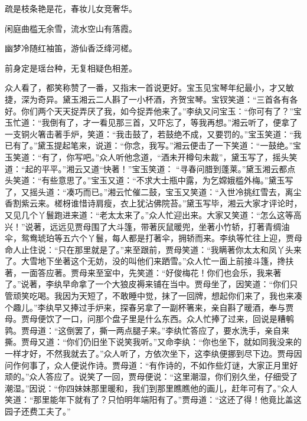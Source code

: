 \begin{poem}
\begin{pl}
        疏是枝条艳是花，春妆儿女竞奢华。
    \end{pl}
    \begin{pl}

        闲庭曲槛无余雪，流水空山有落霞。
    \end{pl}
    \begin{pl}

        幽梦冷随红袖笛，游仙香泛绛河槎。
    \end{pl}
    \begin{pl}

        前身定是瑶台种，无复相疑色相差。
    \end{pl}
\end{poem}


\begin{parag}
    众人看了，都笑称赞了一番，又指末一首说更好。宝玉见宝琴年纪最小，才又敏捷，深为奇异。黛玉湘云二人斟了一小杯酒，齐贺宝琴。宝钗笑道：“三首各有各好。你们两个天天捉弄厌了我，如今捉弄他来了。”李纨又问宝玉：“你可有了？”宝玉忙道：“我倒有了，才一看见那三首，又吓忘了，等我再想。”湘云听了，便拿了一支铜火箸击著手炉，笑道：“我击鼓了，若鼓绝不成，又要罚的。”宝玉笑道：“我已有了。”黛玉提起笔来，说道：“你念，我写。”湘云便击了一下笑道：“一鼓绝。”宝玉笑道：“有了，你写吧。”众人听他念道，“酒未开樽句未裁”，黛玉写了，摇头笑道：“起的平平。”湘云又道“快著！”宝玉笑道： “寻春问腊到蓬莱。”黛玉湘云都点头笑道：“有些意思了。”宝玉又道：“不求大士瓶中露，为乞嫦娥槛外梅。”黛玉写了，又摇头道：“凑巧而已。”湘云忙催二鼓，宝玉又笑道：“入世冷挑红雪去，离尘香割紫云来。槎枒谁惜诗肩瘦，衣上犹沾佛院苔。”黛玉写毕，湘云大家才评论时，又见几个丫鬟跑进来道：“老太太来了。”众人忙迎出来。大家又笑道：“怎么这等高兴！”说著，远远见贾母围了大斗篷，带著灰鼠暖兜，坐著小竹轿，打著青绸油伞，鸳鸯琥珀等五六个丫鬟，每人都是打著伞，拥轿而来。李纨等忙往上迎，贾母命人止住说：“只在那里就是了。”来至跟前，贾母笑道：“我瞒著你太太和凤丫头来了。大雪地下坐著这个无妨，没的叫他们来跴雪。”众人忙一面上前接斗篷，搀扶著，一面答应著。贾母来至室中，先笑道：“好俊梅花！你们也会乐，我来著了。”说著，李纨早命拿了一个大狼皮褥来铺在当中。贾母坐了，因笑道：“你们只管顽笑吃喝。我因为天短了，不敢睡中觉，抹了一回牌，想起你们来了，我也来凑个趣儿。”李纨早又捧过手炉来，探春另拿了一副杯箸来，亲自斟了暖酒，奉与贾母。贾母便饮了一口，问那个盘子里是什么东西。众人忙捧了过来，回说是糟鹌鹑。贾母道：“这倒罢了，撕一两点腿子来。”李纨忙答应了，要水洗手，亲自来撕。贾母又道：“你们仍旧坐下说笑我听。”又命李纨：“你也坐下，就如同我没来的一样才好，不然我就去了。”众人听了，方依次坐下，这李纨便挪到尽下边。贾母因问作何事了，众人便说作诗。贾母道：“有作诗的，不如作些灯谜，大家正月里好顽的。”众人答应了。说笑了一回，贾母便说：“这里潮湿，你们别久坐，仔细受了潮湿。”因说：“你四妹妹那里暖和，我们到那里瞧瞧他的画儿，赶年可有了。”众人笑道：“那里能年下就有了？只怕明年端阳有了。”贾母道：“这还了得！他竟比盖这园子还费工夫了。”
\end{parag}


